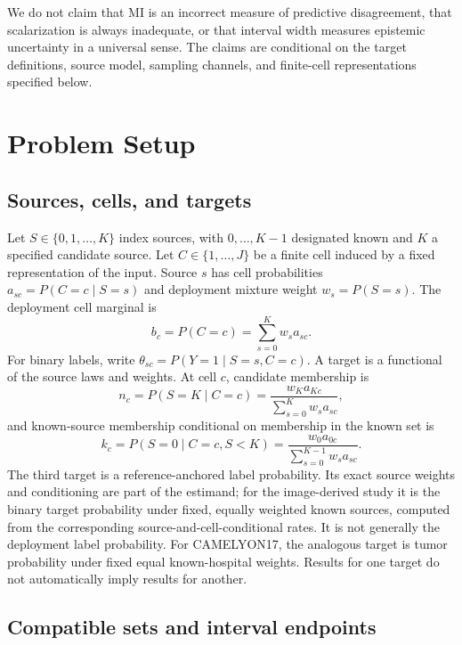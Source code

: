 \documentclass[11pt]{article}
\begin{document}
We do not claim that MI is an incorrect measure of predictive disagreement, that scalarization is always inadequate, or that interval width measures epistemic uncertainty in a universal sense. The claims are conditional on the target definitions, source model, sampling channels, and finite-cell representations specified below.

\section{Problem Setup}

\subsection{Sources, cells, and targets}

Let $S\in\{0,1,\ldots,K\}$ index sources, with $0,\ldots,K-1$ designated known and $K$ a specified candidate source. Let $C\in\{1,\ldots,J\}$ be a finite cell induced by a fixed representation of the input. Source $s$ has cell probabilities $a_{sc}=P(C=c\mid S=s)$ and deployment mixture weight $w_s=P(S=s)$. The deployment cell marginal is
\begin{equation}
 b_c=P(C=c)=\sum_{s=0}^{K}w_sa_{sc}.
\end{equation}
For binary labels, write $\theta_{sc}=P(Y=1\mid S=s,C=c)$. A target is a functional of the source laws and weights. At cell $c$, candidate membership is
\begin{equation}
 n_c=P(S=K\mid C=c)=\frac{w_Ka_{Kc}}{\sum_{s=0}^{K}w_sa_{sc}},
\end{equation}
and known-source membership conditional on membership in the known set is
\begin{equation}
 k_c=P(S=0\mid C=c,S<K)=\frac{w_0a_{0c}}{\sum_{s=0}^{K-1}w_sa_{sc}}.
\end{equation}
The third target is a reference-anchored label probability. Its exact source weights and conditioning are part of the estimand; for the image-derived study it is the binary target probability under fixed, equally weighted known sources, computed from the corresponding source-and-cell-conditional rates. It is not generally the deployment label probability. For CAMELYON17, the analogous target is tumor probability under fixed equal known-hospital weights. Results for one target do not automatically imply results for another.

\subsection{Compatible sets and interval endpoints}
\end{document}
